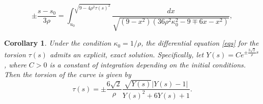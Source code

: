 \documentclass[10pt,a4paper]{amsart}
\newtheorem{corollary}{Corollary}
\begin{document}
\begin{equation}\label{eq26}
    \pm \frac{s - s_0}{3\rho} = \int_{u_0}^{\sqrt{9 - 4\rho^2\tau(s)^2}} \frac{dx}{\sqrt{(9 - x^2)\left(36\rho^2\kappa_0^2 - 9 \mp 6x - x^2\right)}},
\end{equation}

\begin{corollary}\label{cor34}
Under the   condition $\kappa_0 = 1/\rho$, the   differential equation \eqref{eqs} for the torsion $\tau(s)$ admits an  explicit,   exact solution. Specifically, let   $Y(s) = C e^{\pm \frac{2\sqrt{2}}{\rho} s}$, where $C > 0$ is a constant of integration depending on the initial conditions. Then the torsion of the curve is given by
\begin{equation*}
    \tau(s) = \pm \frac{6\sqrt{2}}{\rho} \frac{\sqrt{Y(s)}\big|Y(s) - 1\big|}{Y(s)^2 + 6Y(s) + 1}.
\end{equation*}
\end{corollary}
\end{document}
